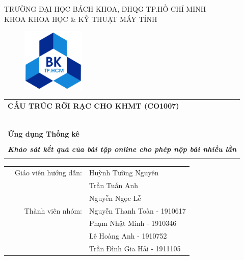 \documentclass[12pt,a4paper]{article}  %
\begin{document}
 
\begin{titlepage}

	\begin{center}
	TRƯỜNG ĐẠI HỌC BÁCH KHOA, ĐHQG TP.HỒ CHÍ MINH\\
	KHOA KHOA HỌC \& KỸ THUẬT MÁY TÍNH
	\end{center}
	
	\vspace{1cm}
	
	\begin{figure}[h!]
	\begin{center}
	\includegraphics[width=3cm]{hcmut.png}
	\end{center}
	\end{figure}
	
	\vspace{1cm}
	
	
	\begin{center}
	\begin{tabular}{c}
	\multicolumn{1}{l}{\textbf{{\Large CẤU TRÚC RỜI RẠC CHO KHMT (CO1007)}}}\\
	~~\\
	\hline
	\\
	\multicolumn{1}{l}{\textbf{{\Large Ứng dụng Thống kê}}}\\
	\\
	\textbf{\normalsize \textit{ Khảo sát kết quả của bài tập online cho phép nộp bài nhiều lần}}\\
	\\
	\hline
	\end{tabular}
	\end{center}
	
	\vspace{3cm}
	
	\begin{table}[h]
	\begin{tabular}{rrl}
	
	\hspace{4 cm} & Giáo viên hướng dẫn: & Huỳnh Tường Nguyên\\
	& & Trần Tuấn Anh \\
	& & Nguyễn Ngọc Lễ  \\
	& Thành viên nhóm: & Nguyễn Thanh Toàn - 1910617 \\
	& & Phạm Nhật Minh - 1910346 \\
	& & Lê Hoàng Anh - 1910752 \\
	& & Trần Đình Gia Hải - 1911105 \\
	

\end{tabular}
\end{table}
\end{titlepage}
\end{document}
